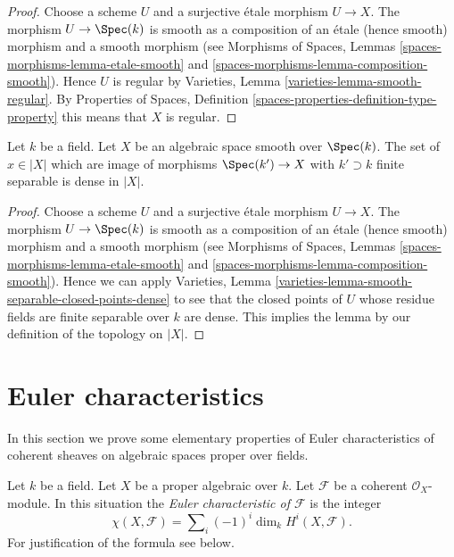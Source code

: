 \begin{proof}
Choose a scheme $U$ and a surjective \'etale morphism $U \to X$.
The morphism $U \to \Spec(k)$ is smooth as a composition of
an \'etale (hence smooth) morphism and a smooth morphism (see
Morphisms of Spaces, Lemmas \ref{spaces-morphisms-lemma-etale-smooth}
and \ref{spaces-morphisms-lemma-composition-smooth}).
Hence $U$ is regular by
Varieties, Lemma \ref{varieties-lemma-smooth-regular}.
By
Properties of Spaces, Definition
\ref{spaces-properties-definition-type-property}
this means that $X$ is regular.
\end{proof}

\begin{lemma}
\label{lemma-smooth-separable-closed-points-dense}
Let $k$ be a field. Let $X$ be an algebraic space smooth over $\Spec(k)$.
The set of $x \in |X|$ which are image of morphisms $\Spec(k') \to X$
with $k' \supset k$ finite separable is dense in $|X|$.
\end{lemma}

\begin{proof}
Choose a scheme $U$ and a surjective \'etale morphism $U \to X$.
The morphism $U \to \Spec(k)$ is smooth as a composition of
an \'etale (hence smooth) morphism and a smooth morphism (see
Morphisms of Spaces, Lemmas \ref{spaces-morphisms-lemma-etale-smooth}
and \ref{spaces-morphisms-lemma-composition-smooth}).
Hence we can apply Varieties, Lemma
\ref{varieties-lemma-smooth-separable-closed-points-dense} to see that
the closed points of $U$ whose residue fields are finite separable over
$k$ are dense. This implies the lemma by our definition of the
topology on $|X|$.
\end{proof}







\section{Euler characteristics}
\label{section-euler}

\noindent
In this section we prove some elementary properties of Euler characteristics
of coherent sheaves on algebraic spaces proper over fields.

\begin{definition}
\label{definition-euler-characteristic}
Let $k$ be a field. Let $X$ be a proper algebraic over $k$. Let $\mathcal{F}$
be a coherent $\mathcal{O}_X$-module. In this situation the
{\it Euler characteristic of $\mathcal{F}$} is the integer
$$
\chi(X, \mathcal{F}) = \sum\nolimits_i (-1)^i \dim_k H^i(X, \mathcal{F}).
$$
For justification of the formula see below.
\end{definition}

